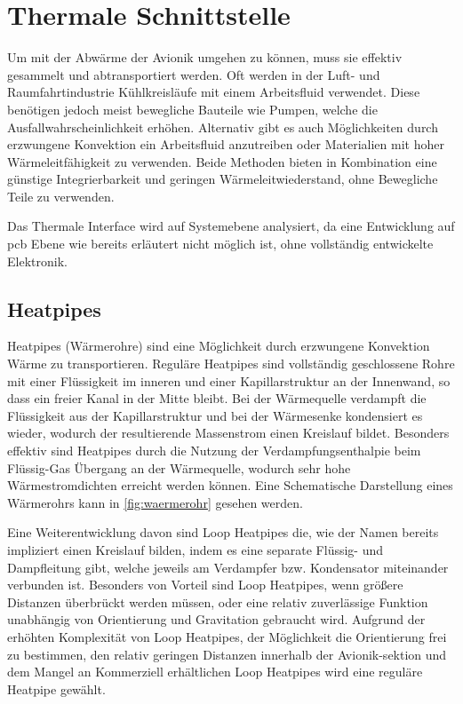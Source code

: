 \section{Thermale Schnittstelle}\label{sec:thermale_schnittstelle}

Um mit der Abwärme der Avionik umgehen zu können, muss sie effektiv gesammelt und abtransportiert werden.
Oft werden in der Luft- und Raumfahrtindustrie Kühlkreisläufe mit einem Arbeitsfluid verwendet. Diese benötigen jedoch
meist bewegliche Bauteile wie Pumpen, welche die Ausfallwahrscheinlichkeit erhöhen. Alternativ gibt es auch
Möglichkeiten durch erzwungene Konvektion ein Arbeitsfluid anzutreiben oder Materialien mit hoher Wärmeleitfähigkeit
zu verwenden. Beide Methoden bieten in Kombination eine günstige Integrierbarkeit und geringen Wärmeleitwiederstand,
ohne Bewegliche Teile zu verwenden.

Das Thermale Interface wird auf Systemebene analysiert, da eine Entwicklung auf \ac{pcb} Ebene wie bereits erläutert nicht
möglich ist, ohne vollständig entwickelte Elektronik.

\subsection{Heatpipes}\label{sec:waermerohre}

Heatpipes (Wärmerohre) sind eine Möglichkeit durch erzwungene Konvektion Wärme zu transportieren. Reguläre Heatpipes
sind vollständig geschlossene Rohre mit einer Flüssigkeit im inneren und einer Kapillarstruktur an der Innenwand,
so dass ein freier Kanal in der Mitte bleibt. Bei der Wärmequelle
verdampft die Flüssigkeit aus der Kapillarstruktur und bei der Wärmesenke kondensiert es wieder, wodurch der resultierende Massenstrom einen
Kreislauf bildet. Besonders effektiv sind Heatpipes durch die Nutzung der Verdampfungsenthalpie beim Flüssig-Gas Übergang an der Wärmequelle,
wodurch sehr hohe Wärmestromdichten erreicht werden können. Eine Schematische Darstellung eines Wärmerohrs kann in \ref{fig:waermerohr}
gesehen werden.

Eine Weiterentwicklung davon sind Loop Heatpipes die, wie der Namen bereits impliziert einen Kreislauf bilden, indem es eine
separate Flüssig- und Dampfleitung gibt, welche jeweils am Verdampfer bzw. Kondensator miteinander verbunden ist.
Besonders von Vorteil sind Loop Heatpipes, wenn größere Distanzen überbrückt werden müssen, oder eine relativ zuverlässige
Funktion unabhängig von Orientierung und Gravitation gebraucht wird. Aufgrund der erhöhten Komplexität von Loop Heatpipes, der Möglichkeit
die Orientierung frei zu bestimmen, den relativ geringen Distanzen innerhalb der Avionik-sektion und dem Mangel an Kommerziell erhältlichen
Loop Heatpipes wird eine reguläre Heatpipe gewählt.


